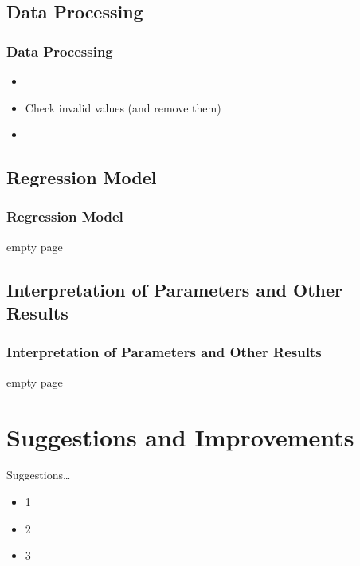 \documentclass{beamer}
\begin{document}
\subsection{Data Processing}
\begin{frame}[fragile]
\frametitle{Data Processing}

\begin{itemize}
\item
\item Check invalid values (and remove them)
\item
\end{itemize}



\end{frame}

\subsection{Regression Model}
\begin{frame}[fragile]
\frametitle{Regression Model}

empty page

\end{frame}

\subsection{Interpretation of Parameters and Other Results}
\begin{frame}[fragile]
\frametitle{Interpretation of Parameters and Other Results}

empty page

\end{frame}

\section{Suggestions and Improvements}
\begin{frame}{Suggestions\dots{}}

\begin{itemize}
\item 1
\item 2
\item 3
\end{itemize}

\end{frame}
\end{document}
